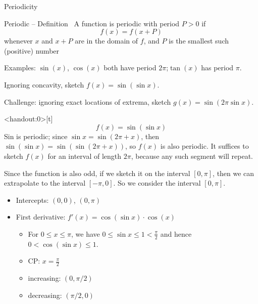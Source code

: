 \begin{frame}[t]{Periodicity}
\begin{block}{Periodic -- Definition~}
A function is \textcolor{M3}{periodic} with period $P>0$ if
\[f(x)=f(x+P)\]
whenever $x$ and $x+P$ are in the domain of $f$, and $P$ is the smallest such (positive) number
\end{block}
Examples: $\sin (x)$, $\cos (x)$ both have period $2\pi$;\quad $\tan (x)$ has period $\pi$.
\end{frame}
\begin{frame}[t]\MoreSpace\AnswerYes

Ignoring concavity, sketch $f(x)=\sin(\sin x)$.

\vfill

Challenge: ignoring exact locations of extrema, sketch $g(x)=\sin(2\pi \sin x)$.

\vfill
{}
\end{frame}
\begin{frame}<handout:0>[t]
\[f(x)=\sin(\sin x)\]\pause
{}
\color{answercolor}
Sin is periodic; since $\sin x = \sin (2\pi+x)$, then $\sin(\sin x) = \sin (\sin (2\pi+x))$, so $f(x)$ is also periodic. It suffices to sketch $f(x)$ for an interval of length $2\pi$, because any such segment will repeat.

Since the function is also odd, if we sketch it on the interval $[0,\pi]$, then we can extrapolate to the interval $[-\pi,0]$. So we consider the interval $[0,\pi]$.

\begin{itemize}
\item Intercepts: $(0,0)$, $(0,\pi)$
\item First derivative: $f'(x) = \cos(\sin x)\cdot \cos(x)$ 
	\begin{itemize}
        \item For $0\le x\le\pi$, we have $0\le\sin x\le 1<\frac{\pi}{2}$ 
            and hence $0<\cos(\sin x)\le 1$.
	\item CP: $x= \frac\pi2$
	\item increasing: $(0,\pi/2)$
	\item decreasing: $(\pi/2,0)$
	\end{itemize}
\end{itemize}
\end{frame}
